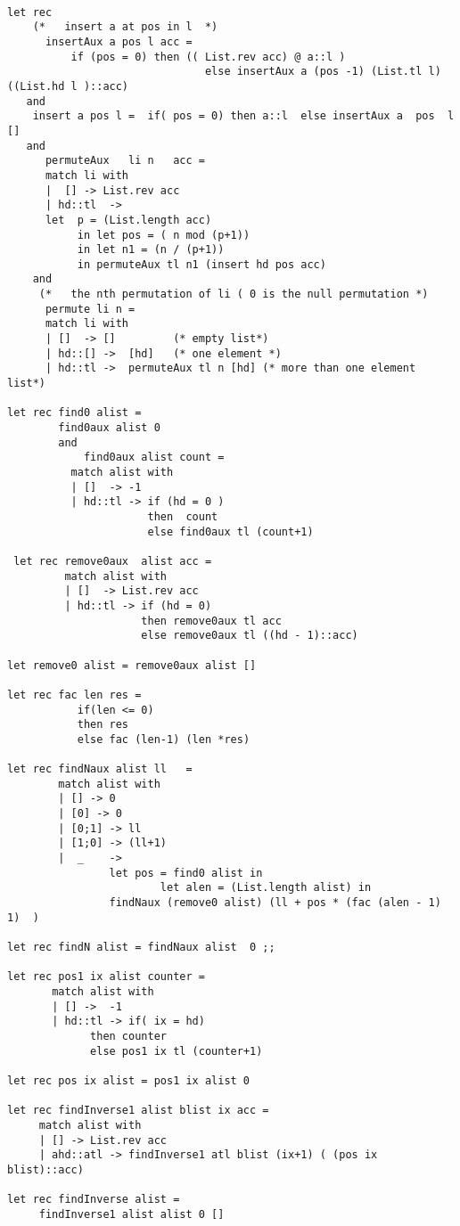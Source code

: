 \documentclass{article} %
\begin{document}
\begin{lstlisting}
       
let rec 
    (*   insert a at pos in l  *)
      insertAux a pos l acc =  
          if (pos = 0) then (( List.rev acc) @ a::l )      
                               else insertAux a (pos -1) (List.tl l)  ((List.hd l )::acc)
   and
	insert a pos l =  if( pos = 0) then a::l  else insertAux a  pos  l []
   and   
      permuteAux   li n   acc =
      match li with 
      |  [] -> List.rev acc
      | hd::tl  -> 
      let  p = (List.length acc) 
           in let pos = ( n mod (p+1))
           in let n1 = (n / (p+1)) 
           in permuteAux tl n1 (insert hd pos acc)
    and
     (*   the nth permutation of li ( 0 is the null permutation *)
      permute li n =
      match li with 
      | []  -> []         (* empty list*)
      | hd::[] ->  [hd]   (* one element *)
      | hd::tl ->  permuteAux tl n [hd] (* more than one element list*)

let rec find0 alist =  
        find0aux alist 0 
		and
		    find0aux alist count =
          match alist with
          | []  -> -1
          | hd::tl -> if (hd = 0 ) 
                      then  count
                      else find0aux tl (count+1)
 
 let rec remove0aux  alist acc =
 		 match alist with 
 		 | []  -> List.rev acc
 		 | hd::tl -> if (hd = 0)
 		             then remove0aux tl acc
 		             else remove0aux tl ((hd - 1)::acc)
 
let remove0 alist = remove0aux alist []

let rec fac len res =
           if(len <= 0) 
           then res
           else fac (len-1) (len *res)

let rec findNaux alist ll   =
        match alist with
        | [] -> 0
        | [0] -> 0
        | [0;1] -> ll
        | [1;0] -> (ll+1)
        |  _    -> 
                let pos = find0 alist in
        				let alen = (List.length alist) in
                findNaux (remove0 alist) (ll + pos * (fac (alen - 1) 1)  )

let rec findN alist = findNaux alist  0 ;;

let rec pos1 ix alist counter =
       match alist with 
       | [] ->  -1
       | hd::tl -> if( ix = hd) 
             then counter
             else pos1 ix tl (counter+1)

let rec pos ix alist = pos1 ix alist 0
     
let rec findInverse1 alist blist ix acc =
	 match alist with
	 | [] -> List.rev acc 
	 | ahd::atl -> findInverse1 atl blist (ix+1) ( (pos ix blist)::acc)
					 
let rec findInverse alist =
	 findInverse1 alist alist 0 [] 
					 
\end{lstlisting}
\end{document}
